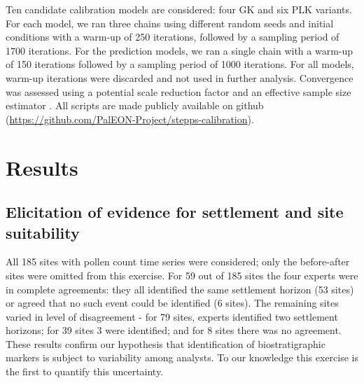 \documentclass[12pt]{article}
\begin{document}
Ten candidate calibration models are considered: four GK and six PLK
variants. For each model, we ran three chains using different random
seeds and initial conditions with a warm-up of 250 iterations,
followed by a sampling period of 1700 iterations. For the prediction
models, we ran a single chain with a warm-up of 150 iterations
followed by a sampling period of 1000 iterations. For all models,
warm-up iterations were discarded and not used in further
analysis. Convergence was assessed using a potential scale reduction
factor and an effective sample size estimator
\citep{gelman2014bayesian}. All scripts are made publicly available on
github (\url{https://github.com/PalEON-Project/stepps-calibration}).



\section{Results}
\subsection{Elicitation of evidence for settlement and site suitability}

All 185 sites with pollen count time series were considered; only the
before-after sites were omitted from this exercise.  For 59 out of 185
sites the four experts were in complete agreements: they all
identified the same settlement horizon (53 sites) or agreed that no
such event could be identified (6 sites). The remaining sites varied
in level of disagreement - for 79 sites, experts identified two
settlement horizons; for 39 sites 3 were identified; and for 8 sites
there was no agreement. These results confirm our hypothesis that
identification of biostratigraphic markers is subject to variability
among analysts. To our knowledge this exercise is the first to
quantify this uncertainty.
\end{document}
